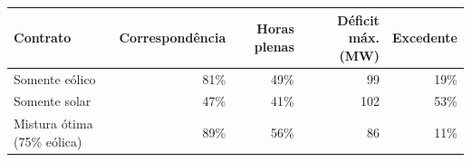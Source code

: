 \begin{tabular}{@{}lrrrr@{}}
		\toprule
		\textbf{Contrato} & \textbf{Correspondência} & \textbf{Horas plenas} & \textbf{Déficit máx. (MW)} & \textbf{Excedente} \\
		\midrule
		Somente eólico & 81\% & 49\% & 99 & 19\% \\
		Somente solar & 47\% & 41\% & 102 & 53\% \\
		Mistura ótima (75\% eólica) & 89\% & 56\% & 86 & 11\% \\
		\bottomrule
	\end{tabular}
